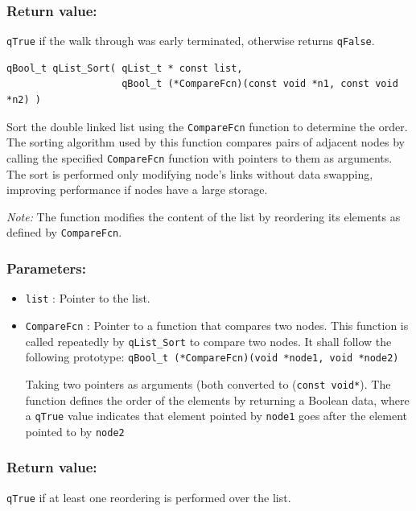 \documentclass{article}
\begin{document}
\subsubsection*{Return value:}
\lstinline{qTrue} if the walk through was early terminated, otherwise returns \lstinline{qFalse}.

\noindent\hrulefill

\begin{lstlisting}[style=CStyle]
qBool_t qList_Sort( qList_t * const list, 
                    qBool_t (*CompareFcn)(const void *n1, const void *n2) ) 
\end{lstlisting} 

Sort the double linked list using the \lstinline{CompareFcn} function to 
determine the order.
The sorting algorithm used by this function compares pairs of adjacent nodes by calling the specified \lstinline{CompareFcn} function with pointers to them as arguments. The sort is performed only modifying node's links without data swapping, improving performance if nodes have a large storage.

\textit{Note:} The function modifies the content of the list by reordering its 
elements as defined by \lstinline{CompareFcn}.

\subsubsection*{Parameters:}
\begin{itemize}
    \item \lstinline{list} : Pointer to the list. 
    \item \lstinline{CompareFcn} : Pointer to a function that compares two nodes.
                    This function is called repeatedly by \lstinline{qList_Sort} to compare two nodes. It shall follow the following prototype:
                    \lstinline{qBool_t (*CompareFcn)(void *node1, void *node2)}
                    
                    Taking two pointers as arguments (both converted to (\lstinline{const void*}). The function defines the order of the elements by returning a Boolean data, where a \lstinline{qTrue} value indicates that element pointed by \lstinline{node1} goes after the element pointed to by \lstinline{node2}
\end{itemize}

\subsubsection*{Return value:}
\lstinline{qTrue} if at least one reordering is performed over the list. 
\end{document}
